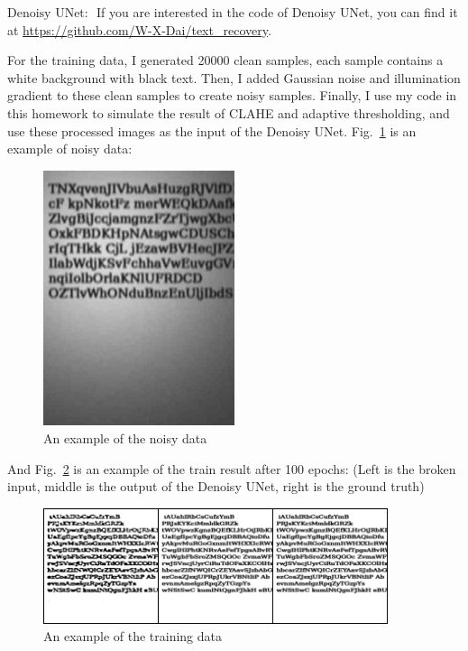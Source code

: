\documentclass[12pt,a4paper]{article}
\begin{document}
\begin{enumerate}
    \textbf{$\boxed{\text{Denoisy UNet: }}$}
    If you are interested in the code of Denoisy UNet, you can find it at \url{https://github.com/W-X-Dai/text_recovery}. 
    
    For the training data, I generated 20000 clean samples, each sample contains a white background with black text. Then, I added Gaussian noise and illumination gradient to these clean samples to create noisy samples. Finally, I use my code in this homework to simulate the result of CLAHE and adaptive thresholding, and use these processed images as the input of the Denoisy UNet. Fig.~\ref{fig:p4_noisy} is an example of noisy data:
    \begin{figure}[H]
        \centering
        \includegraphics[width=0.5\textwidth]{src/img/noisy.png}
        \caption{An example of the noisy data}
        \label{fig:p4_noisy}
    \end{figure}


    And Fig.~\ref{fig:p4_data} is an example of the train result after 100 epochs: (Left is the broken input, middle is the output of the Denoisy UNet, right is the ground truth)
    \begin{figure}[H]
        \centering
        \includegraphics[width=0.9\textwidth]{src/img/dunet.png}
        \caption{An example of the training data}
        \label{fig:p4_data}
    \end{figure}
    

\end{enumerate}
\end{document}
